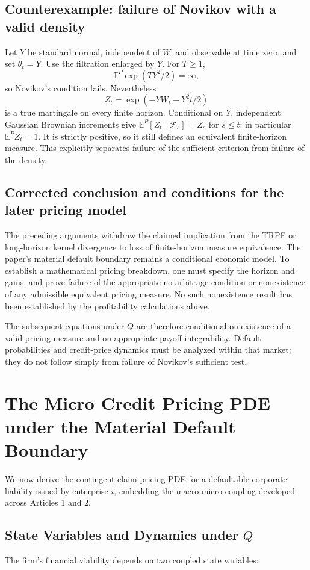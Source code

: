 \documentclass[11pt,letterpaper]{report}
\begin{document}
\subsection{Counterexample: failure of Novikov with a valid density}
Let $Y$ be standard normal, independent of $W$, and observable at
time zero, and set $\theta_t=Y$. Use the filtration enlarged by $Y$.
For $T\ge1$,
\[
 \mathbb E^P\exp(TY^2/2)=\infty,
\]
so Novikov's condition fails. Nevertheless
\[
 Z_t=\exp(-YW_t-Y^2t/2)
\]
is a true martingale on every finite horizon. Conditional on $Y$,
independent Gaussian Brownian increments give
$\mathbb E^P[Z_t\mid\mathcal F_s]=Z_s$ for $s\le t$; in particular
$\mathbb E^P Z_t=1$. It is strictly positive, so it still defines
an equivalent finite-horizon measure. This explicitly separates
failure of the sufficient criterion from failure of the density.

\subsection{Corrected conclusion and conditions for the later pricing model}
The preceding arguments withdraw the claimed implication from the
TRPF or long-horizon kernel divergence to loss of finite-horizon
measure equivalence. The paper's material default boundary remains a
conditional economic model. To establish a mathematical pricing
breakdown, one must specify the horizon and gains, and prove failure
of the appropriate no-arbitrage condition or nonexistence of any
admissible equivalent pricing measure. No such nonexistence result
has been established by the profitability calculations above.

The subsequent equations under $Q$ are therefore conditional on
existence of a valid pricing measure and on appropriate payoff
integrability. Default probabilities and credit-price dynamics must
be analyzed within that market; they do not follow simply from
failure of Novikov's sufficient test.

\section{The Micro Credit Pricing PDE under the Material Default Boundary}
We now derive the contingent claim pricing PDE for a defaultable corporate liability issued by enterprise $i$, embedding the macro-micro coupling developed across Articles 1 and 2.

\subsection{State Variables and Dynamics under $Q$}
The firm's financial viability depends on two coupled state variables:
\end{document}
